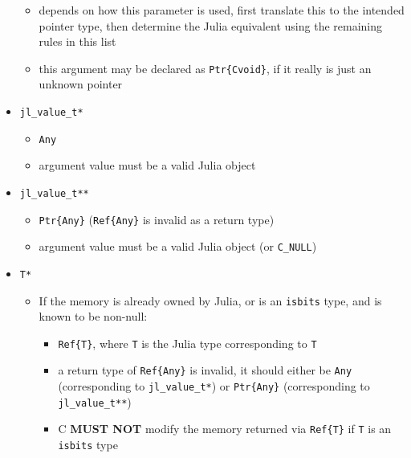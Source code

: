 \begin{itemize}
\begin{itemize}
\item depends on how this parameter is used, first translate this to the intended pointer type, then determine the Julia equivalent using the remaining rules in this list


\item this argument may be declared as \texttt{Ptr\{Cvoid\}}, if it really is just an unknown pointer

\end{itemize}

\item \texttt{jl\_value\_t*}

\begin{itemize}
\item \texttt{Any}


\item argument value must be a valid Julia object

\end{itemize}

\item \texttt{jl\_value\_t**}

\begin{itemize}
\item \texttt{Ptr\{Any\}} (\texttt{Ref\{Any\}} is invalid as a return type)


\item argument value must be a valid Julia object (or \texttt{C\_NULL})

\end{itemize}

\item \texttt{T*}

\begin{itemize}
\item If the memory is already owned by Julia, or is an \texttt{isbits} type, and is known to be non-null:

\begin{itemize}
\item \texttt{Ref\{T\}}, where \texttt{T} is the Julia type corresponding to \texttt{T}


\item a return type of \texttt{Ref\{Any\}} is invalid, it should either be \texttt{Any} (corresponding to \texttt{jl\_value\_t*}) or \texttt{Ptr\{Any\}} (corresponding to \texttt{jl\_value\_t**})


\item C \textbf{MUST NOT} modify the memory returned via \texttt{Ref\{T\}} if \texttt{T} is an \texttt{isbits} type


\end{itemize}
\end{itemize}
\end{itemize}
